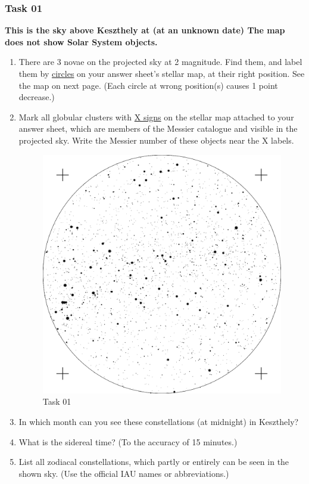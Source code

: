 \documentclass[a4paper,12pt]{extarticle}
\begin{document}
\subsubsection{Task 01}
\textbf{This is the sky above Keszthely at  (at an unknown date) The map does not show Solar System objects.}
\begin{enumerate}
    \item There are 3 novae on the projected sky at 2 magnitude. Find them, and label them by \underline{circles} on your answer sheet’s stellar map, at their right position. See the map on next page. (Each circle at wrong position(s) causes 1 point decrease.)
    \item Mark all globular clusters with \underline{X signs} on the stellar map attached to your answer sheet, which are members of the Messier catalogue and visible in the projected sky. Write the Messier number of these objects near the X labels.

\begin{figure}[H]
    \centering
    \includegraphics[width=0.9\linewidth]{19_O1.png}
    \caption{Task 01}
\end{figure}
\item In which month can you see these constellations (at midnight) in Keszthely?
\item What is the sidereal time? (To the accuracy of 15 minutes.)
\item List all zodiacal constellations, which partly or entirely can be seen in the shown sky. (Use the
official IAU names or abbreviations.)
\end{enumerate}
\end{document}
